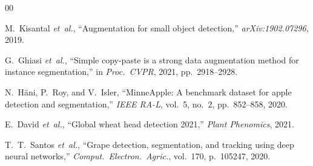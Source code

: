 \documentclass[conference,a4paper]{IEEEtran}
\begin{document}
\begin{thebibliography}{00}

M.~Kisantal \textit{et~al.},
``Augmentation for small object detection,''
\textit{arXiv:1902.07296}, 2019.

G.~Ghiasi \textit{et~al.},
``Simple copy-paste is a strong data augmentation method for
instance segmentation,''
in \textit{Proc.\ CVPR}, 2021, pp.~2918--2928.

N.~H\"{a}ni, P.~Roy, and V.~Isler,
``MinneApple: A benchmark dataset for apple detection and
segmentation,''
\textit{IEEE RA-L}, vol.~5, no.~2, pp.~852--858, 2020.

E.~David \textit{et~al.},
``Global wheat head detection 2021,''
\textit{Plant Phenomics}, 2021.

T.~T.~Santos \textit{et~al.},
``Grape detection, segmentation, and tracking using deep
neural networks,''
\textit{Comput.\ Electron.\ Agric.}, vol.~170, p.~105247, 2020.

\end{thebibliography}
\end{document}
